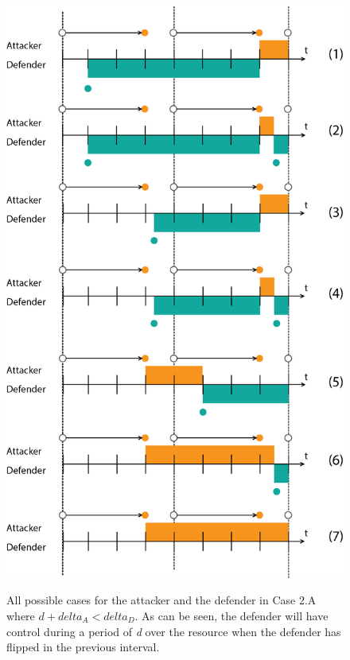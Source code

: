 \begin{figure}[hbtp]
\caption{All possible cases for the attacker and the defender in Case 2.A where $d + delta_{A} < delta_{D}$. As can be seen, the defender will have control during a period of \textit{d} over the resource when the defender has flipped in the previous interval.}
\centering
\includegraphics[scale=0.7]{../../doc/template/Images/FlipItCase2a.png}
\label{fig:case2}
\end{figure}


